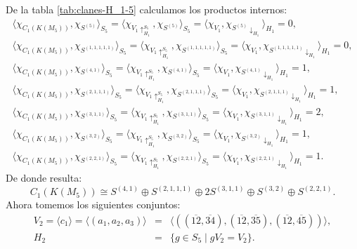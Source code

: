 \documentclass[12pt]{book}
\theoremstyle{definition}
\newcounter{in}
\begin{document}
De la tabla \ref{tab:clanes-H_1-5} calculamos los productos internos:
\begin{eqnarray*}
  \langle\chi_{C_{1}(K(M_{5}))},\chi_{S^{(5)}}\rangle_{S_{5}}=\langle\chi_{V_{1}\uparrow^{S_{5}}_{H_1}},\chi_{S^{(5)}}\rangle_{S_{5}}=\langle\chi_{V_{1}},\chi_{S^{(5)}\downarrow_{H_{1}}}\rangle_{H_{1}}=0,\\
  \langle\chi_{C_{1}(K(M_{5}))},\chi_{S^{(1,1,1,1,1)}}\rangle_{S_{5}}=\langle\chi_{V_{1}\uparrow^{S_{5}}_{H_1}},\chi_{S^{(1,1,1,1,1)}}\rangle_{S_{5}}=\langle\chi_{V_{1}},\chi_{S^{(1,1,1,1,1)}\downarrow_{H_{1}}}\rangle_{H_{1}}=0,\\
  \langle\chi_{C_{1}(K(M_{5}))},\chi_{S^{(4,1)}}\rangle_{S_{5}}=\langle\chi_{V_{1}\uparrow^{S_{5}}_{H_1}},\chi_{S^{(4,1)}}\rangle_{S_{5}}=\langle\chi_{V_{1}},\chi_{S^{(4,1)}\downarrow_{H_{1}}}\rangle_{H_{1}}=1,\\
  \langle\chi_{C_{1}(K(M_{5}))},\chi_{S^{(2,1,1,1)}}\rangle_{S_{5}}=\langle\chi_{V_{1}\uparrow^{S_{5}}_{H_1}},\chi_{S^{(2,1,1,1)}}\rangle_{S_{5}}=\langle\chi_{V_{1}},\chi_{S^{(2,1,1,1)}\downarrow_{H_{1}}}\rangle_{H_{1}}=1,\\
  \langle\chi_{C_{1}(K(M_{5}))},\chi_{S^{(3,1,1)}}\rangle_{S_{5}}=\langle\chi_{V_{1}\uparrow^{S_{5}}_{H_1}},\chi_{S^{(3,1,1)}}\rangle_{S_{5}}=\langle\chi_{V_{1}},\chi_{S^{(3,1,1)}\downarrow_{H_{1}}}\rangle_{H_{1}}=2,\\
  \langle\chi_{C_{1}(K(M_{5}))},\chi_{S^{(3,2)}}\rangle_{S_{5}}=\langle\chi_{V_{1}\uparrow^{S_{5}}_{H_1}},\chi_{S^{(3,2)}}\rangle_{S_{5}}=\langle\chi_{V_{1}},\chi_{S^{(3,2)}\downarrow_{H_{1}}}\rangle_{H_{1}}=1,\\
  \langle\chi_{C_{1}(K(M_{5}))},\chi_{S^{(2,2,1)}}\rangle_{S_{5}}=\langle\chi_{V_{1}\uparrow^{S_{5}}_{H_1}},\chi_{S^{(2,2,1)}}\rangle_{S_{5}}=\langle\chi_{V_{1}},\chi_{S^{(2,2,1)}\downarrow_{H_{1}}}\rangle_{H_{1}}=1.
\end{eqnarray*}
De donde resulta:
\begin{equation}
  C_{1}(K(M_{5}))\cong S^{(4,1)}\oplus S^{(2,1,1,1)}\oplus
  2S^{(3,1,1)}\oplus S^{(3,2)} \oplus S^{(2,2,1)}.
  \label{C1-KM5}
\end{equation}
Ahora tomemos los siguientes conjuntos:
\begin{eqnarray*}
V_{2}=\langle c_{1}\rangle=\langle
(a_{1},a_{2},a_{3})\rangle&=&\langle((\overline{12},\overline{34}),(\overline{12},\overline{35}),(\overline{12},\overline{45}))\rangle,\\
H_{2}&=&\{g\in S_{5}\mid gV_{2}=V_{2}\}.
\end{eqnarray*}
\end{document}
